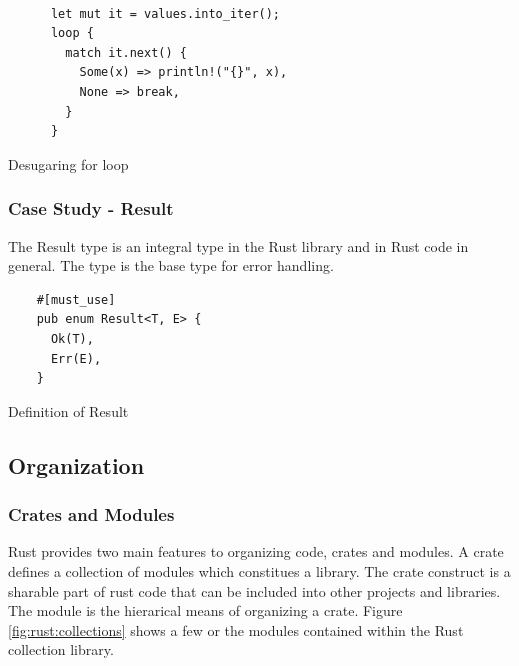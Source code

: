 \begin{minipage}[b]{0.5\linewidth}
  \begin{listing}[H]
    \begin{verbatim}

      let mut it = values.into_iter();
      loop {
        match it.next() {
          Some(x) => println!("{}", x),
          None => break,
        }
      }

    \end{verbatim}

    \caption{Desugaring for loop}
    \label{lst:rust:desugared-for}
  \end{listing}
\end{minipage}

\subsubsection{Case Study - Result}

The Result type is an integral type in the Rust library and in Rust code in general.
The type is the base type for error handling.

\begin{listing}[H]
  \begin{verbatim}
    #[must_use]
    pub enum Result<T, E> {
      Ok(T),
      Err(E),
    }
\end{verbatim}
\caption{Definition of Result}
\label{lst:rust:result}
\end{listing}

\subsection{Organization}
\label{ssub:rust:organization}

\subsubsection{Crates and Modules}

Rust provides two main features to organizing code, crates and modules.
A crate defines a collection of modules which constitues a library.
The crate construct is a sharable part of rust code that can be included into other projects and libraries.
The module is the hierarical means of organizing a crate.
Figure \ref{fig:rust:collections} shows a few or the modules contained within the Rust collection library.

